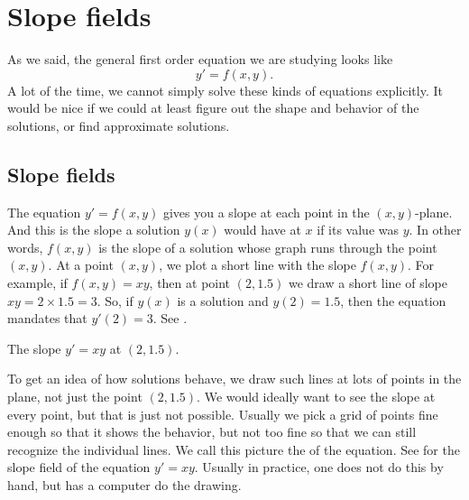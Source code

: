 
\sectionnewpage
\section{Slope fields}
\label{slopefields:section}


%

As we said, the general first order equation we are studying looks like
\begin{equation*}
y' = f(x,y).
\end{equation*}
A lot of the time, we cannot simply solve these kinds of equations explicitly.
It would be nice if we could at least figure out the shape and behavior of
the solutions, or find approximate solutions.

\subsection{Slope fields}

The equation $y' = f(x,y)$
gives you a slope at each point 
in the
$(x,y)$-plane.  And this is the slope a solution $y(x)$ would have 
at $x$ if its value was $y$.  In other words, $f(x,y)$ is the slope
of a solution whose graph runs through the
point $(x,y)$.  At a point $(x,y)$, we plot a short line
with the slope $f(x,y)$.
For example, if $f(x,y) = xy$, then at point $(2,1.5)$ we draw a
short line of slope $xy = 2 \times 1.5 = 3$.  So, if $y(x)$ is a solution
and $y(2) = 1.5$, then the equation mandates that $y'(2) = 3$.
See .

\begin{myfig}
\capstart
{}
\caption{The slope $y'=xy$ at $(2,1.5)$.\label{1.3:fig0}}
\end{myfig}

To get an idea of how solutions behave, we draw such lines at lots
of points in the plane, not just the point $(2,1.5)$.  We would
ideally want to see the slope at every point, but that is
just not possible.  Usually we pick a
grid of points fine enough so that it shows the behavior, but not too
fine so that we can still recognize the individual lines.
We call this picture the \emph{} of the equation.
See  for the slope field of the equation $y' = xy$.
Usually in practice, one does not do this by hand, but has a computer do the
drawing.

